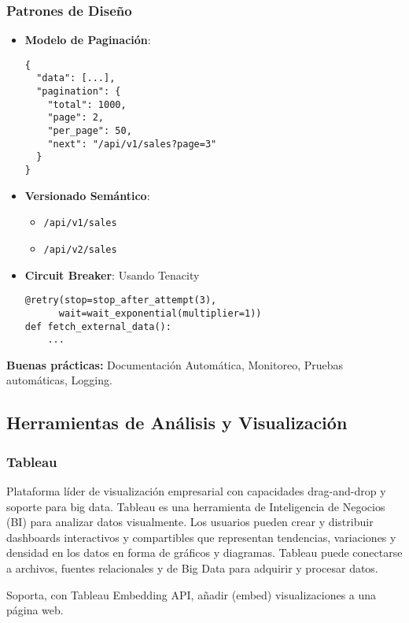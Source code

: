 \documentclass[12pt]{book}
\begin{document}
\subsubsection{Patrones de Diseño}
\begin{itemize}
    \item \textbf{Modelo de Paginación}:
    \begin{verbatim}
{
  "data": [...],
  "pagination": {
    "total": 1000,
    "page": 2,
    "per_page": 50,
    "next": "/api/v1/sales?page=3"
  }
}
    \end{verbatim}
    
    \item \textbf{Versionado Semántico}:
    \begin{itemize}
        \item \texttt{/api/v1/sales}
        \item \texttt{/api/v2/sales}
    \end{itemize}
    
    \item \textbf{Circuit Breaker}: Usando Tenacity
    \begin{verbatim}
@retry(stop=stop_after_attempt(3), 
      wait=wait_exponential(multiplier=1))
def fetch_external_data():
    ...
    \end{verbatim}
\end{itemize}

\textbf{Buenas prácticas:} Documentación Automática, Monitoreo, Pruebas automáticas, Logging.

\subsection{Herramientas de Análisis y Visualización}

\subsubsection{Tableau}
Plataforma líder de visualización empresarial con capacidades drag-and-drop y soporte para big data.
Tableau es una herramienta de Inteligencia de Negocios (BI) para analizar datos visualmente. Los usuarios 
pueden crear y distribuir dashboards interactivos y compartibles que representan tendencias, 
variaciones y densidad en los datos en forma de gráficos y diagramas. Tableau puede conectarse a 
archivos, fuentes relacionales y de Big Data para adquirir y procesar datos.

Soporta, con Tableau Embedding API, añadir (embed) visualizaciones a una página web.
\end{document}
